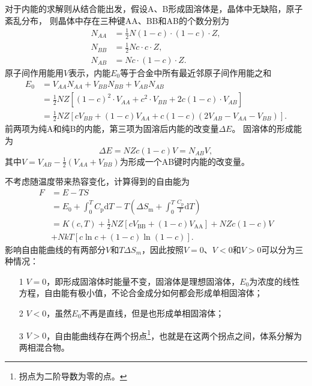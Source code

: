             对于内能的求解则从结合能出发，假设A、B形成固溶体是，晶体中无缺陷，原子紊乱分布，
            则晶体中存在三种键AA、BB和AB的个数分别为
            \begin{align}
                N_{AA}&=\frac{1}{2}N(1-c)\cdot(1-c)\cdot Z,\\
                N_{B B}&=\frac{1}{2} N c \cdot c \cdot Z,\\
                N_{A B}&=N c \cdot(1-c) \cdot Z.
            \end{align}
            原子间作用能用$V$表示，内能$E_0$等于合金中所有最近邻原子间作用能之和
            \begin{equation}
                \begin{aligned}
                    E_{0}&=V_{A A} N_{A A}+V_{B B} N_{B B}+V_{A B} N_{A B}\\
                    &=\frac{1}{2} N Z\left[(1-c)^{2} \cdot V_{A A}+c^{2} \cdot V_{B B}+2 c(1-c) \cdot V_{A B}\right]\\
                    &=\frac{1}{2} N Z\left[c V_{B B}+(1-c) V_{A A}+c(1-c)\left(2 V_{A B}-V_{A A}-V_{B B}\right)\right].
                \end{aligned}
            \end{equation}
            前两项为纯A和纯B的内能，第三项为固溶后内能的改变量$\Delta E$。
            固溶体的形成能为
            \begin{equation}
                \Delta E=NZc(1-c)V=N_{AB}V,
            \end{equation}
            其中$V=V_{AB}-\frac{1}{2}(V_{AA}+V_{BB})$为形成一个AB键时内能的改变量。
            
            不考虑随温度带来热容变化，计算得到的自由能为
            \begin{equation}
                \begin{aligned}
                    F&=E-TS\\
                    &=E_0+\int_{0}^{T} C_{\mathrm{p}} \mathrm{d} T-T\left(\Delta S_{\mathrm{m}}+\int_{0}^{T} \frac{C_{\mathrm{p}}}{T} \mathrm{d} T\right)\\
                    &=K(c, T)+\frac{1}{2} N Z\left[c V_{\mathrm{BB}}+(1-c) V_{\mathrm{AA}}\right]+N Z c(1-c) V\\
                    &+N k T[c \ln c+(1-c) \ln (1-c)].
                \end{aligned}\label{固溶体自由能的表达式}
            \end{equation}
            影响自由能曲线的有两部分$V$和$T\Delta S_m$，因此按照$V=0$、$V<0$和$V>0$可以分为三种情况：
            \begin{enumerate}
                \item[1] $V=0$，即形成固溶体时能量不变，固溶体是理想固溶体，$E_0$为浓度的线性方程，自由能有极小值，不论合金成分如何都会形成单相固溶体；
                \item[2] $V<0$，虽然$E_0$不再是直线，但是也形成单相固溶体；
                \item[3] $V>0$，自由能曲线存在两个拐点\footnote{拐点为二阶导数为零的点。}，也就是在这两个拐点之间，体系分解为两相混合物。
            \end{enumerate}


